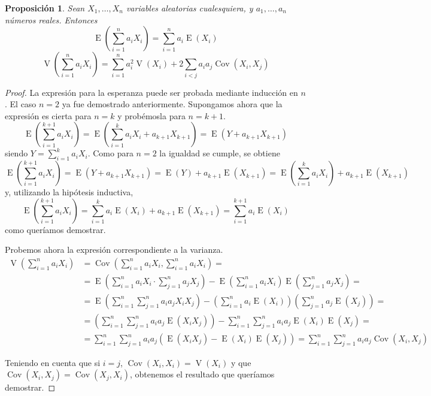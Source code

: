 \documentclass[11pt]{article}
\theoremstyle{plain}
\newtheorem*{pro}{Proposición}
\theoremstyle{definition}
\theoremstyle{remark}
\newcommand{\esp}[0]{\ensuremath{\operatorname{E}}}  %
\newcommand{\var}[0]{\ensuremath{\operatorname{V}}}  %
\newcommand{\cov}[0]{\ensuremath{\operatorname{Cov}}}  %
\begin{document}
      \begin{pro}
        Sean $X_1, \dots, X_n$ variables aleatorias cualesquiera, y $a_1,\dots,a_n$ números reales. Entonces
        \[ \esp\left( \sum_{i=1}^n a_i X_i \right) = \sum_{i=1}^n a_i \esp(X_i) \]
        \[ \var\left( \sum_{i=1}^n a_i X_i \right) = \sum_{i=1}^n a_i^2 \var(X_i) + 2 \sum_{i < j} a_i a_j \cov(X_i,X_j) \]
      \end{pro}
      \begin{proof}
        La expresión para la esperanza puede ser probada mediante inducción en $n$. El caso $n = 2$ ya fue demostrado anteriormente. Supongamos ahora que la expresión es cierta para $n = k$ y probémosla para $n = k + 1$.
        \[ \esp \left( \sum_{i=1}^{k+1} a_i X_i \right) = \esp \left( \sum_{i=1}^k a_i X_i + a_{k+1} X_{k+1} \right) = \esp (Y + a_{k+1} X_{k+1}) \]
        siendo $Y = \sum_{i=1}^k a_i X_i$. Como para $n = 2$ la igualdad se cumple, se obtiene
        \[ \esp \left( \sum_{i=1}^{k+1} a_i X_i \right) = \esp(Y + a_{k+1} X_{k+1}) = \esp(Y) + a_{k+1} \esp(X_{k+1}) = \esp \left( \sum_{i=1}^k a_i X_i \right) + a_{k+1} \esp(X_{k+1}) \]
        y, utilizando la hipótesis inductiva,
        \[ \esp \left( \sum_{i=1}^{k+1} a_i X_i \right) = \sum_{i=1}^k a_i \esp(X_i) + a_{k+1} \esp(X_{k+1}) = \sum_{i=1}^{k+1} a_i \esp(X_i) \]
        como queríamos demostrar.

        Probemos ahora la expresión correspondiente a la varianza.
        \[ \begin{split}
          \var \left( \sum_{i=1}^n a_i X_i \right) &= \cov \left( \sum_{i=1}^n a_i X_i, \sum_{i=1}^n a_i X_i \right) = \\
          &= \esp \left( \sum_{i=1}^n a_i X_i \cdot \sum_{j=1}^n a_j X_j \right) - \esp \left( \sum_{i=1}^n a_i X_i \right) \esp \left( \sum_{j=1}^n a_j X_j \right) = \\
          &= \esp \left( \sum_{i=1}^n \sum_{j=1}^n a_i a_j X_i X_j \right) - \left( \sum_{i=1}^n a_i \esp(X_i) \right) \left( \sum_{j=1}^n a_j \esp(X_j) \right) = \\
          &= \left( \sum_{i=1}^n \sum_{j=1}^n a_i a_j \esp (X_i X_j) \right) - \sum_{i=1}^n \sum_{j=1}^n a_i a_j \esp(X_i) \esp(X_j) = \\
          &= \sum_{i=1}^n \sum_{j=1}^n a_i a_j \left( \esp (X_i X_j) - \esp(X_i) \esp(X_j) \right) = \sum_{i=1}^n \sum_{j=1}^n a_i a_j \cov(X_i, X_j)
        \end{split} \]

        Teniendo en cuenta que si $i = j$, $\cov(X_i, X_i) = \var(X_i)$ y que $\cov(X_i, X_j) = \cov(X_j, X_i)$, obtenemos el resultado que queríamos demostrar.
      \end{proof}
\end{document}
